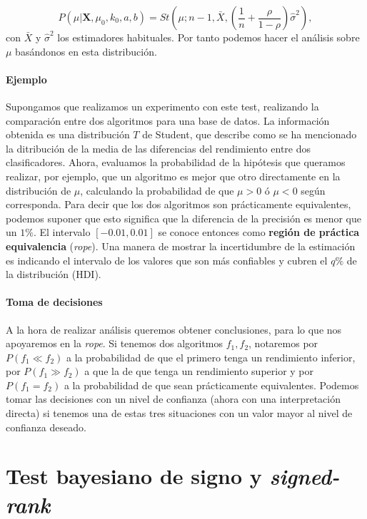 	\[
		P(\mu | \mathbf{X}, \mu_0, k_0, a, b) =
			St \left(
					\mu; n-1 , \bar{X},
					\left( \frac{1}{n} + 
							\frac{\rho}{1 - \rho} 
					\right) \hat{\sigma}^2
			   \right),
	\]
	con $\bar{X}$ y $\hat{\sigma}^2$ los estimadores 
habituales. Por tanto podemos hacer el análisis sobre $\mu$ 
basándonos en esta distribución.


\paragraph{Ejemplo} Supongamos que realizamos un experimento
con este test, realizando la comparación entre dos algoritmos
para una base de datos. La información obtenida es una 
distribución $T$ de Student, que describe como se ha mencionado
la ditribución de la media de las diferencias del rendimiento
entre dos clasificadores. Ahora, evaluamos la probabilidad 
de la hipótesis que queramos realizar, por ejemplo, que un 
algoritmo es mejor que otro directamente en la distribución
de $\mu$, calculando la probabilidad de que $\mu > 0$ ó $\mu 
< 0$ según corresponda. Para decir que los dos algoritmos son
prácticamente equivalentes, podemos suponer que esto 
significa que la diferencia de la precisión es menor que un
$1\%$. El intervalo $[-0.01, 0.01]$ se conoce entonces como
\textbf{región de práctica equivalencia} (\textit{rope}). Una manera 
de mostrar la incertidumbre de la estimación es indicando el 
intervalo de los valores que son más confiables y cubren el 
$q\%$ de la distribución (HDI). 

\paragraph{Toma de decisiones} A la hora de realizar 
análisis queremos obtener conclusiones, para lo que nos 
apoyaremos en la \textit{rope}. Si tenemos dos algoritmos $f_1, f_2$, 
notaremos por $P(f_1 \ll f_2)$ a la probabilidad de que el 
primero tenga un rendimiento inferior, por $P(f_1 \gg f_2)$ a 
que la de que tenga un rendimiento superior y por $P(f_1 =
f_2)$ a la probabilidad de que sean prácticamente 
equivalentes. Podemos tomar las decisiones con un nivel
de confianza (ahora con una interpretación directa) si
tenemos una de estas tres situaciones con un valor mayor
al nivel de confianza deseado.

\section{Test bayesiano de signo y \textit{signed-rank}}

